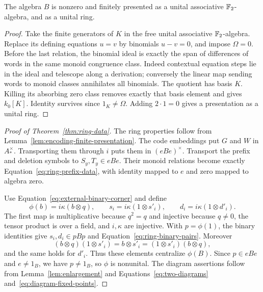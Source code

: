 \begin{lemma}\label{lem:encoding-finite-presentation}
The algebra $B$ is nonzero and finitely
presented as a unital associative
$\mathbb F_2$-algebra, and as a unital ring.
\end{lemma}

\begin{proof}
Take the finite generators of $K$ in
the free unital associative $\mathbb F_2$-algebra.
Replace its defining equations $u=v$
by binomials $u-v=0$, and impose
$\Omega=0$.  Before the last relation,
the binomial ideal is exactly the span
of differences of words in the same
monoid congruence class.  Indeed
contextual equation steps lie in the
ideal and telescope along a derivation;
conversely the linear map sending words
to monoid classes annihilates all
binomials.  The quotient has basis $K$.
Killing its absorbing zero class removes
exactly that basis element and gives
$k_0[K]$.  Identity survives since
$1_K\ne\Omega$.  Adding $2\cdot1=0$
gives a presentation as a unital ring.
\end{proof}

\begin{proof}[Proof of Theorem~\ref{thm:ring-data}]
The ring properties follow from
Lemma~\ref{lem:encoding-finite-presentation}.
The code embeddings put $G$ and $W$
in $A_*^\times$.  Transporting them
through $i$ puts them in $(eBe)^\times$.
Transport the prefix and deletion
symbols to $S_y,T_y\in eBe$.
Their monoid relations become exactly
Equation~\eqref{eq:ring-prefix-data},
with identity mapped to $e$ and zero
mapped to algebra zero.

Use Equation~\eqref{eq:external-binary-corner}
and define
\begin{equation}\label{eq:encoding-phi}
 \phi(b)=i\kappa(b\otimes q),\qquad
 s_i=i\kappa(1\otimes s'_i),\qquad
 d_i=i\kappa(1\otimes d'_i).
\end{equation}
The first map is multiplicative because
$q^2=q$ and injective because $q\ne0$,
the tensor product is over a field,
and $i,\kappa$ are injective.  With
$p=\phi(1)$, the binary identities
give $s_i,d_i\in pBp$ and
Equation~\eqref{eq:ring-binary-pairs}.
Moreover
\[
 (b\otimes q)(1\otimes s'_i)
   =b\otimes s'_i
   =(1\otimes s'_i)(b\otimes q),
\]
and the same holds for $d'_i$.
Thus these elements centralize $\phi(B)$.
Since $p\in eBe$ and $e\ne1_B$,
we have $p\ne1_B$, so $\phi$ is
nonunital.  The diagram assertions
follow from Lemma~\ref{lem:enlargement}
and Equations~\eqref{eq:two-diagrams}
and~\eqref{eq:diagram-fixed-points}.
\end{proof}
